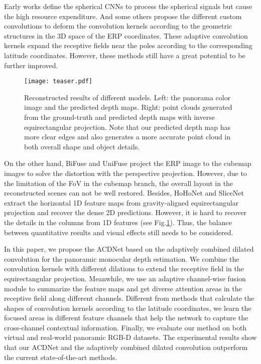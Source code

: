 \documentclass[letterpaper]{article} \usepackage{aaai21}  \usepackage{times}  \usepackage{helvet} \usepackage{courier}  \usepackage[hyphens]{url}  \usepackage{graphicx} \urlstyle{rm} \def\UrlFont{\rm}  \usepackage{natbib}  \usepackage{caption} \frenchspacing  \setlength{\pdfpagewidth}{8.5in}  \setlength{\pdfpageheight}{11in}
\begin{document}
Early works \cite{DBLP:journals/corr/abs-1709-04893,DBLP:conf/iclr/CohenGKW18} define the spherical CNNs to process the spherical signals but cause the high resource expenditure. 
And some others \cite{DBLP:conf/nips/SuG17,DBLP:conf/eccv/TatenoNT18,DBLP:conf/eccv/CoorsCG18,DBLP:journals/ral/Fernandez-Labrador20} propose the different custom convolutions to deform the convolution kernels according to the geometric structures in the 3D space of the ERP coordinates. 
These adaptive convolution kernels expand the receptive fields near the poles according to the corresponding latitude coordinates.
However, these methods still have a great potential to be further improved.

\begin{figure}[tb]
\centering
  \texttt{[image: teaser.pdf]}
  \caption{Reconstructed results of different models. Left: the panorama color image and the predicted depth maps. Right: point clouds generated from the ground-truth and predicted depth maps with inverse equirectangular projection. Note that our predicted depth map has more clear edges and also generates a more accurate point cloud in both overall shape and object details.}
  \label{fig:teaser}
\end{figure}

On the other hand, BiFuse \cite{DBLP:conf/cvpr/WangYSCT20} and UniFuse \cite{DBLP:journals/ral/JiangSZDH21} project the ERP image to the cubemap images to solve the distortion with the perspective projection. However, due to the limitation of the FoV in the cubemap branch, the overall layout in the reconstructed scenes can not be well restored.
Besides, HoHoNet \cite{Sun_2021_CVPR} and SliceNet \cite{Pintore_2021_CVPR} extract the horizontal 1D feature maps from gravity-aligned equirectangular projection and recover the dense 2D predictions. However, it is hard to recover the details in the columns from 1D features (see Fig.\ref{fig:teaser}). Thus, the balance between quantitative results and visual effects still needs to be considered.

In this paper, we propose the ACDNet based on the adaptively combined dilated convolution for the panoramic monocular depth estimation. 
We combine the convolution kernels with different dilations to extend the receptive field in the equirectangular projection. 
Meanwhile, we use an adaptive channel-wise fusion module to summarize the feature maps and get diverse attention areas in the receptive field along different channels.
Different from methods \cite{DBLP:conf/nips/SuG17,DBLP:conf/eccv/TatenoNT18,DBLP:conf/eccv/CoorsCG18,DBLP:journals/ral/Fernandez-Labrador20} that calculate the shapes of convolution kernels according to the latitude coordinates, we learn the focused areas in different feature channels that help the network to capture the cross-channel contextual information. 
Finally, we evaluate our method on both virtual and real-world panoramic RGB-D datasets. The experimental results show that our ACDNet and the adaptively combined dilated convolution outperform the current state-of-the-art methods.
\end{document}

